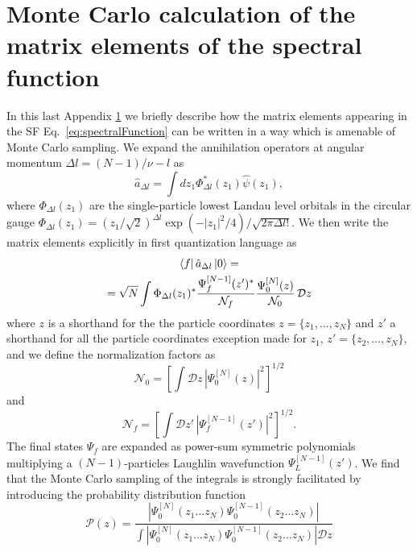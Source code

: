 \documentclass[twocolumn,pra,superscriptaddress,noshowpacs]{revtex4}
\begin{document}
\section{Monte Carlo calculation of the matrix elements of the spectral function}\label{appendix:SpectralFunctionMC}
In this last Appendix \ref{appendix:SpectralFunctionMC} we briefly describe how the matrix elements appearing in the SF Eq.~\eqref{eq:spectralFunction} can be written in a way which is amenable of Monte Carlo sampling.
We expand the annihilation operators at angular momentum $\Delta l = (N-1)/\nu-l$  as 
\begin{equation}
\hat{a}_{\Delta l} = \int dz_1 \Phi_{\Delta l}^*(z_1) \hat{\psi}(z_1),
\end{equation}
where
$\Phi_{\Delta l}(z_1)$ are the single-particle lowest Landau level orbitals in the circular gauge $\Phi_{\Delta l}(z_1) = \left(z_1/\sqrt{2}\right)^{\Delta l} \exp(-|z_1|^2/4) /\sqrt{2\pi \Delta l!}$.
We then write the matrix elements explicitly in first quantization language as
\begin{multline}
    \label{eq:spectralFunctionMicroscopicMC}
    \bra{f}\hat{a}_{\Delta l}\ket{0} = \\
    =\sqrt{N}\int \Phi_{\Delta l}(z_1)^*\frac{{\Psi_{f}^{[N-1]}}(z')^*}{\mathcal{N}_f} \frac{\Psi_0^{[N]}(z)}{\mathcal{N}_0}\, \mathcal{D}z
\end{multline}
where $z$ is a shorthand for the the particle coordinates $z=\{z_1,\ldots,z_N\}$ and $z'$ a shorthand for all the particle coordinates exception made for $z_1$, $z'=\{z_2,\ldots,z_N\}$, and we define the normalization factors as
\begin{equation}
    \mathcal{N}_0=\left[\int \mathcal{D}z\,\left|\Psi_0^{[N]}(z)\right|^2\right]^{1/2}
\end{equation}
and
\begin{equation}
    \mathcal{N}_f=\left[\int \mathcal{D}z'\,\left|\Psi_f^{[N-1]}(z')\right|^2\right]^{1/2}.
\end{equation}
The final states $\Psi_{f}$ are expanded as power-sum symmetric polynomials multiplying a $(N-1)$-particles Laughlin wavefunction  $\Psi_L^{[N-1]}(z')$. 
We find that the Monte Carlo sampling of the integrals is strongly facilitated by introducing the probability distribution function
\begin{equation}
    \label{eq:PDF}
    \mathcal{P}(z) = \frac{|\Psi_0^{[N]}(z_1\hdots z_N)\Psi_0^{[N-1]}(z_2\hdots z_N)|}{\int |\Psi_0^{[N]}(z_1\hdots z_N)\Psi_0^{[N-1]}(z_2\hdots z_N)|\mathcal{D}z}
\end{equation}
\end{document}
